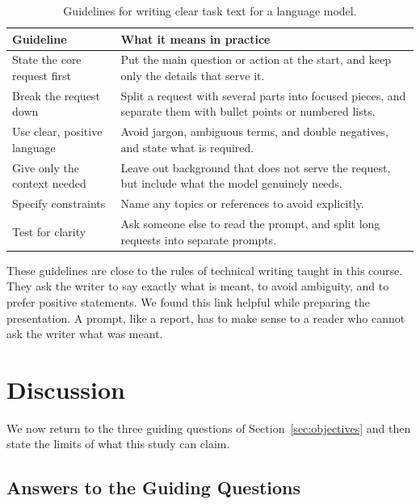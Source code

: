 \documentclass[12pt]{article}
\begin{document}
\begin{table}[htbp]
  \centering
  \caption{Guidelines for writing clear task text for a language model.}
  \label{tab:guidelines}
  \small
  \begin{tabularx}{\textwidth}{@{}>{\raggedright\arraybackslash}p{4.3cm} L@{}}
    \toprule
    \textbf{Guideline} & \textbf{What it means in practice}\\
    \midrule
    State the core request first  & Put the main question or action at the start, and keep only the details that serve it.\\
    Break the request down        & Split a request with several parts into focused pieces, and separate them with bullet points or numbered lists.\\
    Use clear, positive language  & Avoid jargon, ambiguous terms, and double negatives, and state what is required.\\
    Give only the context needed  & Leave out background that does not serve the request, but include what the model genuinely needs.\\
    Specify constraints           & Name any topics or references to avoid explicitly.\\
    Test for clarity              & Ask someone else to read the prompt, and split long requests into separate prompts.\\
    \bottomrule
  \end{tabularx}
\end{table}

These guidelines are close to the rules of technical writing taught in this course. They ask
the writer to say exactly what is meant, to avoid ambiguity, and to prefer positive
statements. We found this link helpful while preparing the presentation. A prompt, like a
report, has to make sense to a reader who cannot ask the writer what was meant.

\section{Discussion}\label{sec:discussion}

We now return to the three guiding questions of Section~\ref{sec:objectives} and then state
the limits of what this study can claim.

\subsection{Answers to the Guiding Questions}\label{sec:answers}
\end{document}
